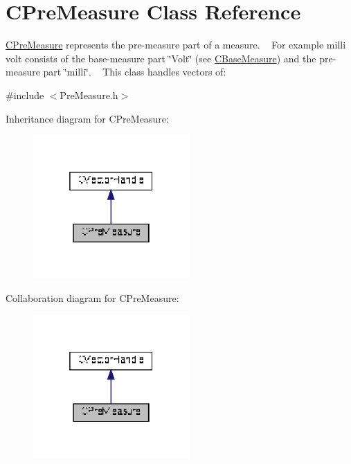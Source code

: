 \hypertarget{classCPreMeasure}{}\section{C\+Pre\+Measure Class Reference}
\label{classCPreMeasure}


\hyperlink{classCPreMeasure}{C\+Pre\+Measure} represents the pre-\/measure part of a measure. ~\newline
 For example milli volt consists of the base-\/measure part \char`\"{}\+Volt\char`\"{} (see \hyperlink{classCBaseMeasure}{C\+Base\+Measure}) and the pre-\/measure part \char`\"{}milli\char`\"{}. ~\newline
 This class handles vectors of\+:  




{\ttfamily \#include $<$Pre\+Measure.\+h$>$}



Inheritance diagram for C\+Pre\+Measure\+:
\nopagebreak
\begin{figure}[H]
\begin{center}
\leavevmode
\includegraphics[width=169pt]{d9/da8/classCPreMeasure__inherit__graph}
\end{center}
\end{figure}


Collaboration diagram for C\+Pre\+Measure\+:
\nopagebreak
\begin{figure}[H]
\begin{center}
\leavevmode
\includegraphics[width=169pt]{d4/d1d/classCPreMeasure__coll__graph}
\end{center}
\end{figure}
